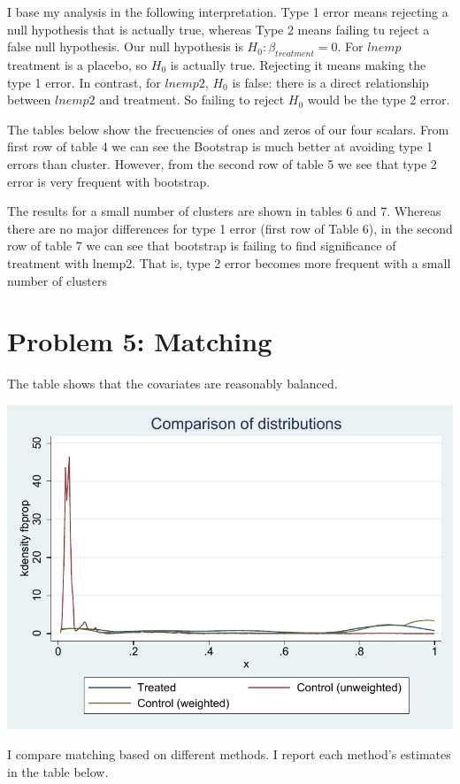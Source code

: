 \documentclass[12pt]{article}
\begin{document}
I base my analysis in the following interpretation. Type 1 error means rejecting a null hypothesis that is actually true, whereas Type 2 means failing tu reject a false null hypothesis. Our null hypothesis is $H_0:\beta_{treatment}=0$. For $lnemp$ treatment is a placebo, so $H_0$ is actually true. Rejecting it means making the type 1 error. In contrast, for $lnemp2$, $H_0$ is false: there is a direct relationship between $lnemp2$ and treatment. So failing to reject $H_0$ would be the type 2 error. 

The tables below show the frecuencies of ones and zeros of our four scalars. From first row of table 4 we can see the Bootstrap is much better at avoiding type 1 errors than cluster. However, from the second row of table 5 we see that type 2 error is very frequent with bootstrap. 

The results for a small number of clusters are shown in tables 6 and 7. Whereas there are no major differences for type 1 error (first row of Table 6), in the second row of table 7 we can see that bootstrap is failing to find significance of treatment with lnemp2. That is, type 2 error becomes more frequent with a small number of clusters





\bigskip
\pagebreak
\section{Problem 5: Matching}


\restoregeometry
The table shows that the covariates are reasonably balanced.	
\begin{stlog}\end{stlog}
\begin{center}
    \includegraphics{797B_PS1_JL_7.pdf}
\end{center}
I compare matching based on different 
methods. I report each method's estimates in the table below. 

\restoregeometry
\end{document}
